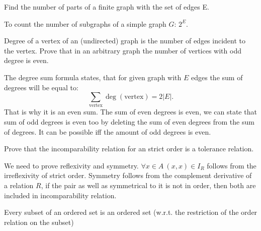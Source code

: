 \documentclass[12pt]{report}
\begin{document}
\boldmath
{}
\setcounter{subsection}{2}
    \begin{problem}{}
        Find the number of parts of a finite graph with the set of edges E.
    \end{problem}
    \begin{solution}
        To count the number of subgraphs of a simple graph $G$: $2^E$.
    \end{solution}
    \begin{problem}{}
        Degree of a vertex of an (undirected) graph is the number of edges incident to the vertex. Prove that in an arbitrary graph the number of vertices with odd degree is even. 
    \end{problem}
    \begin{solution}
        The degree sum formula states, that for given graph with $E$ edges the sum of degrees will be equal to:
        \[
            \sum\limits_{\text{vertex}} \deg(\text{vertex}) = 2|E|.  
        \] 
        That is why it is an even sum. The sum of even degrees is even, we can state that sum of odd degrees is even too by deleting the sum of even degrees from the sum of degrees. It can be possible iff the amount of odd degrees is even.
    \end{solution}
    \begin{problem}{}
        Prove that the incomparability relation for an strict order is a tolerance relation.
    \end{problem}
    \begin{solution}
        We need to prove reflexivity and symmetry. $\forall x \in A \ (x,x) \in I_R$ follows from the irreflexivity of strict order. Symmetry follows from the complement derivative of a relation $R$, if the pair as well as symmetrical to it is not in order, then both are included in incomparability relation.
    \end{solution}
    \begin{problem}{}
        Every subset of an ordered set is an ordered set (w.r.t. the restriction of the order relation on the subset)
    \end{problem}
\end{document}
